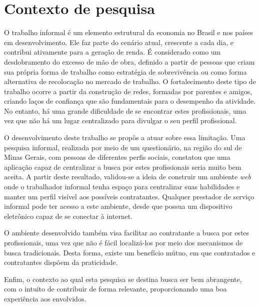 \section{Contexto de pesquisa}
\par O trabalho informal é um elemento estrutural da economia no Brasil e nos países em desenvolvimento. Ele faz parte do cenário atual, crescente a cada dia, e contribui ativamente para a geração de renda. É considerado como um desdobramento do excesso de mão de obra, definido a partir de pessoas que criam sua própria forma de trabalho como estratégia de sobrevivência ou como forma alternativa de recolocação no mercado de trabalho. O fortalecimento deste tipo de trabalho ocorre a partir da construção de redes, formadas por parentes e amigos, criando laços de confiança que são fundamentais para o desempenho da atividade. No entanto, há uma grande dificuldade de se encontrar estes profissionais, uma vez que não há um lugar centralizado para divulgar o seu perfil profissional.

\par O desenvolvimento deste trabalho se propôs a atuar sobre essa limitação. Uma pesquisa informal, realizada por meio de um questionário, na região do sul de Minas Gerais, com pessoas de diferentes perfis sociais, constatou que uma aplicação capaz de centralizar a busca por estes profissionais seria muito bem aceita. A partir deste resultado, validou-se a ideia de construir um ambiente \textit{web} onde o trabalhador informal tenha espaço para centralizar suas habilidades e manter um perfil visível aos possíveis contratantes. Qualquer prestador de serviço informal pode ter acesso a este ambiente, desde que possua um dispositivo eletrônico capaz de se conectar à internet. 

\par O ambiente desenvolvido também visa facilitar ao contratante a busca por estes profissionais, uma vez que não é fácil localizá-los por meio dos mecanismos de busca tradicionais. Desta forma, existe um benefício mútuo, em que contratados e contratantes dispõem da praticidade.

\par Enfim, o contexto ao qual esta pesquisa se destina busca ser bem abrangente, com o intuito de contribuir de forma relevante, proporcionando uma boa experiência aos envolvidos.
 

